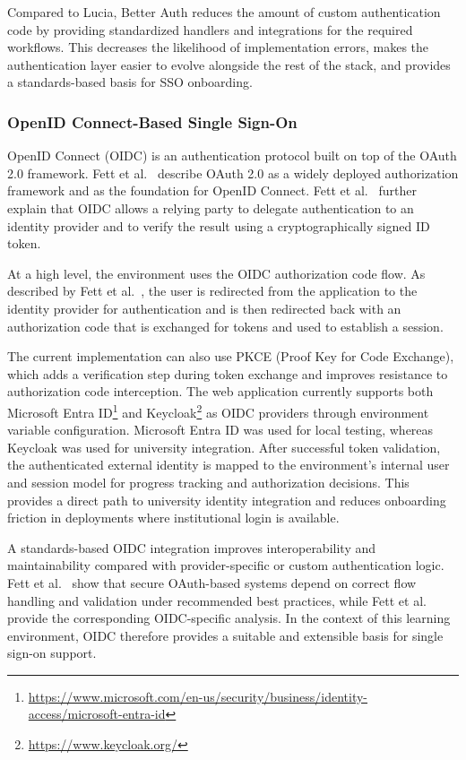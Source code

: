 Compared to Lucia, Better Auth reduces the amount of custom authentication code by providing standardized handlers and integrations for the required workflows.
This decreases the likelihood of implementation errors, makes the authentication layer easier to evolve alongside the rest of the stack, and provides a standards-based basis for SSO onboarding.

\subsubsection{OpenID Connect-Based Single Sign-On} \label{subsubsec:openid-connect-based-single-sign-on}
OpenID Connect (OIDC) is an authentication protocol built on top of the OAuth 2.0 framework.
Fett et al.~\cite{fett_comprehensive_2016} describe OAuth 2.0 as a widely deployed authorization framework and as the foundation for OpenID Connect.
Fett et al.~\cite{fett_web_2017} further explain that OIDC allows a relying party to delegate authentication to an identity provider and to verify the result using a cryptographically signed ID token.

At a high level, the environment uses the OIDC authorization code flow.
As described by Fett et al.~\cite{fett_web_2017}, the user is redirected from the application to the identity provider for authentication and is then redirected back with an authorization code that is exchanged for tokens and used to establish a session.

The current implementation can also use PKCE (Proof Key for Code Exchange), which adds a verification step during token exchange and improves resistance to authorization code interception.
The web application currently supports both Microsoft Entra ID\footnote{\url{https://www.microsoft.com/en-us/security/business/identity-access/microsoft-entra-id}} and Keycloak\footnote{\url{https://www.keycloak.org/}} as OIDC providers through environment variable configuration.
Microsoft Entra ID was used for local testing, whereas Keycloak was used for university integration.
After successful token validation, the authenticated external identity is mapped to the environment's internal user and session model for progress tracking and authorization decisions.
This provides a direct path to university identity integration and reduces onboarding friction in deployments where institutional login is available.

A standards-based OIDC integration improves interoperability and maintainability compared with provider-specific or custom authentication logic.
Fett et al.~\cite{fett_comprehensive_2016} show that secure OAuth-based systems depend on correct flow handling and validation under recommended best practices, while Fett et al.~\cite{fett_web_2017} provide the corresponding OIDC-specific analysis.
In the context of this learning environment, OIDC therefore provides a suitable and extensible basis for single sign-on support.

